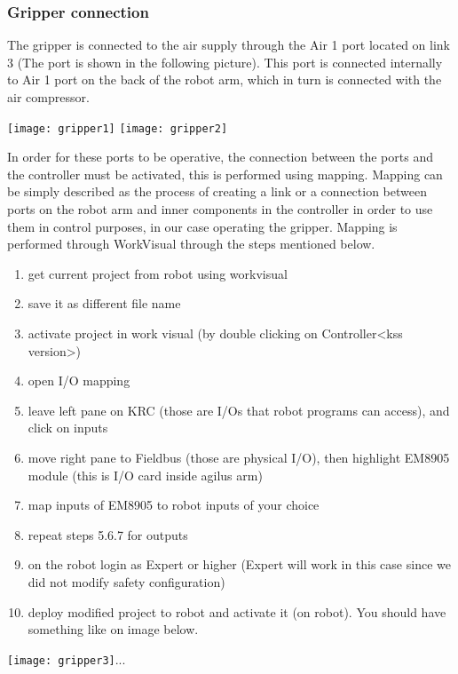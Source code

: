  		\subsubsection{Gripper connection}
 		The gripper is connected to the air supply through the Air 1 port located on link 3 (The port is shown in the following picture). This port is connected internally to Air 1 port on the back of the robot arm, which in turn is connected with the air compressor.
\begin{center}
    \texttt{[image: gripper1]}
    \texttt{[image: gripper2]}
\end{center}

 		\bigskip
 		In order for these ports to be operative, the connection between the ports and the controller must be activated, this is performed using mapping. Mapping can be simply described as the process of creating a link or a connection between ports on the robot arm and inner components in the controller in order to use them in control purposes, in our case operating the gripper. Mapping is performed through WorkVisual through the steps mentioned below.
 			\begin{enumerate}
 				\item get current project from robot using workvisual
 				\item save it as different file name
 				\item activate project in work visual (by double clicking on Controller<kss version>)
 				\item open I/O mapping
 				\item leave left pane on KRC (those are I/Os that robot programs can access), and click on inputs
 				\item move right pane to Fieldbus (those are physical I/O), then highlight EM8905 module (this is I/O card inside agilus arm)
 				\item map inputs of EM8905 to robot inputs of your choice
 				\item repeat steps 5.6.7 for outputs
 				\item on the robot login as Expert or higher (Expert will work in this case since we did not modify safety configuration)
 				\item deploy modified project to robot and activate it (on robot).
 				You should have something like on image below. 
 			\end{enumerate}
 		\begin{center}
 			\texttt{[image: gripper3]}...
 		\end{center}
